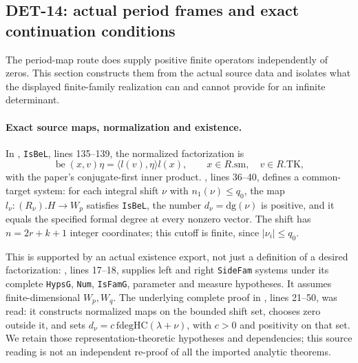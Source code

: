 \subsection{DET-14: actual period frames and exact continuation conditions}
The period-map route does supply positive finite operators independently
of zeros. This section constructs them from the actual source data
and isolates what the displayed finite-family realization can and
cannot provide for an infinite determinant.

\paragraph{Exact source maps, normalization and existence.}
In ,
\texttt{IsBeL}, lines 135--139, the normalized factorization is
\[
 \operatorname{be}(x,v)\eta=\langle l(v),\eta\rangle l(x),
 \qquad x\in R.\mathrm{sm},\quad v\in R.\mathrm{TK},
\]
with the paper's conjugate-first inner product.
,
lines 36--40, defines a common-target system:
for each integral shift \(\nu\) with \(n_1(\nu)\le q_0\),
the map \(l_\nu:(R_\nu).H\to W_p\) satisfies \texttt{IsBeL},
the number \(d_\nu=\mathrm{dg}(\nu)\) is positive, and it equals
the specified formal degree at every nonzero vector.
The shift has \(n=2r+k+1\) integer coordinates; this cutoff is finite,
since \(|\nu_i|\le q_0\).

This is supported by an actual existence export, not just a
definition of a desired factorization:
,
lines 17--18, supplies left and right \texttt{SideFam} systems under
its complete \texttt{HypsG}, \texttt{Num}, \texttt{IsFamG},
parameter and measure hypotheses. It assumes finite-dimensional
\(W_p,W_q\). The underlying complete proof in
,
lines 21--50, was read: it constructs normalized maps on the
bounded shift set, chooses zero outside it, and sets
\(d_\nu=c\,\mathrm{fdegHC}(\lambda+\nu)\), with \(c>0\) and
positivity on that set. We retain those representation-theoretic
hypotheses and dependencies; this source reading is not an independent
re-proof of all the imported analytic theorems.

